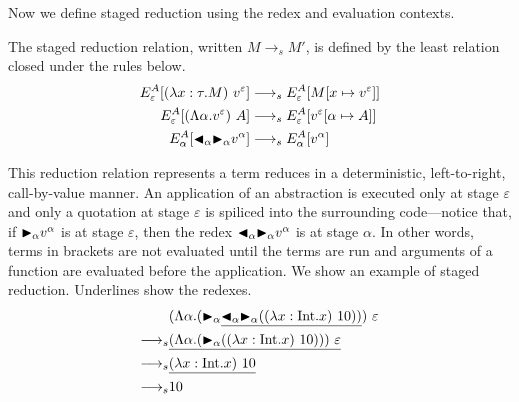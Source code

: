 Now we define staged reduction using the redex and evaluation contexts.

\begin{definition}
  The staged reduction relation, written $M \longrightarrow_s M'$, is defined by
  the least relation closed under the rules below.
  \begin{align*}
    E^A_\varepsilon [(\lambda x:\tau.M)\ v^\varepsilon] & \longrightarrow_s E^A_\varepsilon[M[x\mapsto v^\varepsilon]]      \\
    E^A_\varepsilon [(\Lambda\alpha.v^\varepsilon)\ A]  & \longrightarrow_s E^A_\varepsilon[v^\varepsilon[\alpha\mapsto A]] \\
    E^A_\alpha [{\mathop{\blacktriangleleft}}_\alpha {\mathop{\blacktriangleright}}_\alpha v^\alpha]        & \longrightarrow_s E^A_\alpha[v^\alpha]                            \\
  \end{align*}
\end{definition}

This reduction relation represents a term reduces in a deterministic,
left-to-right, call-by-value manner.  An application of an abstraction
is executed only at stage \(\varepsilon\) and only a quotation at
stage \(\varepsilon\) is spiliced into the surrounding code---notice
that, if \({\mathop{\blacktriangleright}}_\alpha v^\alpha\) is at stage \(\varepsilon\), then the
redex \({\mathop{\blacktriangleleft}}_\alpha {\mathop{\blacktriangleright}}_\alpha v^\alpha\) is at stage \(\alpha\).
In other words, terms in brackets are not evaluated until the terms are run
and arguments of a function are evaluated before the application.
We show an example of staged reduction.
Underlines show the redexes.
\begin{align*}
                    & (\Lambda\alpha.(\TB_\alpha \underline{\TBL_\alpha \TB_\alpha ((\lambda x:\I.x)\ 10))})\ \varepsilon \\
  \longrightarrow_s & \underline{(\Lambda\alpha.(\TB_\alpha ((\lambda x:\I.x)\ 10)))\ \varepsilon}                        \\
  \longrightarrow_s & \underline{(\lambda x:\I.x)\ 10}                                                                    \\
  \longrightarrow_s & 10
\end{align*}
